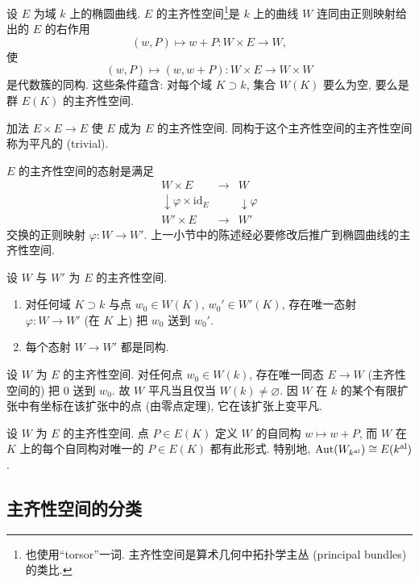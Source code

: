 设 $E$ 为域 $k$ 上的椭圆曲线. $E$ 的主齐性空间\footnote{也使用``torsor''一词. 主齐性空间是算术几何中拓扑学主丛 (principal bundles) 的类比.}是 $k$ 上的曲线 $W$ 连同由正则映射给出的 $E$ 的右作用
\[
(w, P)\mapsto w + P\colon W\times E\to W,
\]
使
\[
(w, P)\mapsto(w, w + P)\colon W\times E\to W\times W
\]
是代数簇的同构. 这些条件蕴含: 对每个域 $K\supset k$, 集合 $W(K)$ 要么为空, 要么是群 $E(K)$ 的主齐性空间.

\begin{example} \label{thm:4.7.4} 
加法 $E\times E\to E$ 使 $E$ 成为 $E$ 的主齐性空间. 同构于这个主齐性空间的主齐性空间称为平凡的 (trivial).
\end{example}

$E$ 的主齐性空间的态射是满足
\[
\begin{array}{ccc}
W\times E & \to & W\\
\downarrow{\varphi\times\mathrm{id}_E} & & \downarrow{\varphi}\\
W'\times E & \to & W'
\end{array}
\]
交换的正则映射 $\varphi\colon W\to W'$. 上一小节中的陈述经必要修改后推广到椭圆曲线的主齐性空间.

\begin{aside} \label{thm:4.7.5} 
设 $W$ 与 $W'$ 为 $E$ 的主齐性空间.
\begin{enumerate}[label=\textup{(\alph*)}]
\item 对任何域 $K\supset k$ 与点 $w_0\in W(K)$, $w_0'\in W'(K)$, 存在唯一态射 $\varphi\colon W\to W'$ (在 $K$ 上) 把 $w_0$ 送到 $w_0'$.
\item 每个态射 $W\to W'$ 都是同构.
\end{enumerate}
\end{aside}

\begin{aside} \label{thm:4.7.6} 
设 $W$ 为 $E$ 的主齐性空间. 对任何点 $w_0\in W(k)$, 存在唯一同态 $E\to W$ (主齐性空间的) 把 $0$ 送到 $w_0$. 故 $W$ 平凡当且仅当 $W(k)\neq\varnothing$. 因 $W$ 在 $k$ 的某个有限扩张中有坐标在该扩张中的点 (由零点定理), 它在该扩张上变平凡.
\end{aside}

\begin{aside} \label{thm:4.7.7} 
设 $W$ 为 $E$ 的主齐性空间. 点 $P\in E(K)$ 定义 $W$ 的自同构 $w\mapsto w + P$, 而 $W$ 在 $K$ 上的每个自同构对唯一的 $P\in E(K)$ 都有此形式. 特别地, $\operatorname{Aut}(W_{k^{\mathrm{al}}})\cong E(k^{\mathrm{al}})$.
\end{aside}

\subsection*{主齐性空间的分类}

